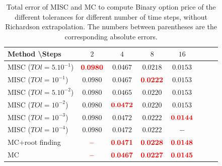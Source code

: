 \documentclass[11pt]{article}
\begin{document}
\begin{table}[h!]
	\centering
	\begin{tabular}{l*{6}{c}r}
		Method \textbackslash  Steps            & $2$ & $4$ & $8$ & $16$  \\
		\hline
		MISC ($TOl=5.10^{-1}$)  & $\mathbf{{\color{red}0.0980}}$ & $\mathbf{0.0467}$ & $\mathbf{ 0.0218}$ & $\mathbf{0.0153}$  \\
		MISC ($TOl=10^{-1}$)  &$\mathbf{0.0980}$& $\mathbf{0.0467}$ & $\mathbf{{\color{red}0.0222}}$ & $\mathbf{0.0153}$   \\
		MISC ($TOl=5.10^{-2}$) & $\mathbf{0.0980}$ & $\mathbf{0.0465}$ & $\mathbf{0.0220}$ & $\mathbf{0.0153}$  \\
		MISC ($TOl=10^{-2}$)  & $\mathbf{0.0980}$ & $\mathbf{{\color{red} 0.0472}}$ & $\mathbf{ 0.0220}$ & $\mathbf{0.0153}$    \\
		MISC ($TOl=10^{-3}$)  & $\mathbf{0.0980}$  & $\mathbf{ 0.0472}$  & $\mathbf{ 0.0222}$  & $\mathbf{{\color{red}0.0144}}$\\
	MISC ($TOl=10^{-4}$)  & $\mathbf{0.0980}$ & $\mathbf{0.0472}$ & $\mathbf{ 0.0222}$ & $\mathbf{-}$  \\
		\hline
		MC+root finding   &  $\mathbf{{\color{red}-}}$ & $\mathbf{{\color{red}0.0471}}$ & $\mathbf{{\color{red}0.0228}}$ & $\mathbf{{\color{red}0.0148}}$  \\	
			MC     &  $\mathbf{{\color{red}-}}$ & $\mathbf{{\color{red}0.0467}}$ & $\mathbf{{\color{red}0.0227}}$ & $\mathbf{{\color{red}0.0145}}$  \\	
		\hline
	\end{tabular}
	\caption{Total error of MISC and MC to compute Binary option price of the different tolerances for different number of time steps, without Richardson extrapolation. The numbers between parentheses are the corresponding absolute errors.}
	\label{Total error of MISC and MC to compute Binary option price of the different tolerances for different number of time steps, without Richardson extrapolation. The numbers between parentheses are the corresponding absolute errors.}
\end{table}
\end{document}

